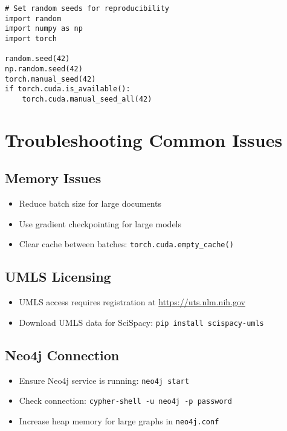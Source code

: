 \begin{verbatim}
# Set random seeds for reproducibility
import random
import numpy as np
import torch

random.seed(42)
np.random.seed(42)
torch.manual_seed(42)
if torch.cuda.is_available():
    torch.cuda.manual_seed_all(42)
\end{verbatim}

\section{Troubleshooting Common Issues}

\subsection{Memory Issues}
\begin{itemize}
    \item Reduce batch size for large documents
    \item Use gradient checkpointing for large models
    \item Clear cache between batches: \texttt{torch.cuda.empty\_cache()}
\end{itemize}

\subsection{UMLS Licensing}
\begin{itemize}
    \item UMLS access requires registration at \url{https://uts.nlm.nih.gov}
    \item Download UMLS data for SciSpacy: \texttt{pip install scispacy-umls}
\end{itemize}

\subsection{Neo4j Connection}
\begin{itemize}
    \item Ensure Neo4j service is running: \texttt{neo4j start}
    \item Check connection: \texttt{cypher-shell -u neo4j -p password}
    \item Increase heap memory for large graphs in \texttt{neo4j.conf}
\end{itemize}